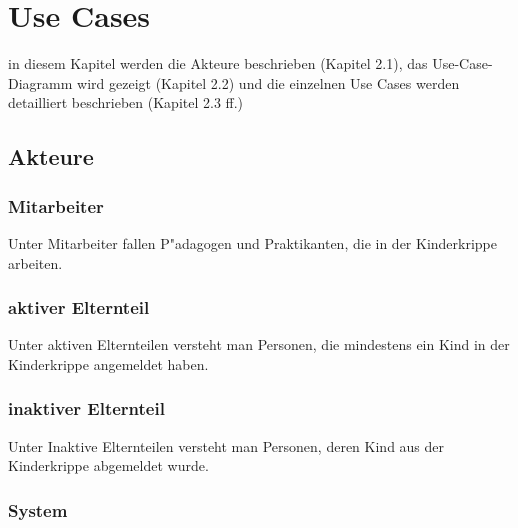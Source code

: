 \newpage
\section{Use Cases}
  in diesem Kapitel werden die Akteure beschrieben (Kapitel 2.1), das Use-Case-Diagramm wird gezeigt (Kapitel 2.2) und die einzelnen Use Cases werden detailliert beschrieben (Kapitel 2.3 ff.)
  
\subsection{Akteure}
  \subsubsection{Mitarbeiter}
    Unter Mitarbeiter fallen P"adagogen und Praktikanten, die in der Kinderkrippe arbeiten.
    
  \subsubsection{aktiver Elternteil}
    Unter aktiven Elternteilen versteht man Personen, die mindestens ein Kind in der Kinderkrippe angemeldet haben.
    
  \subsubsection{inaktiver Elternteil}
    Unter Inaktive Elternteilen versteht man Personen, deren Kind aus der Kinderkrippe abgemeldet wurde.
    
  \subsubsection{System}  
    
 \newpage
